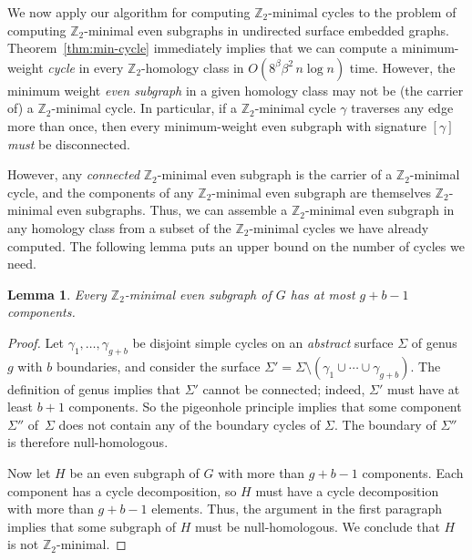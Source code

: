 \documentclass[11pt,twoside]{article}
\def\Z{\mathbb{Z}}
\newtheorem{lemma}[theorem]{Lemma}
\begin{document}
{We now apply our algorithm for computing $\Z_2$-minimal cycles to the problem of computing $\Z_2$-minimal even subgraphs in undirected surface embedded graphs.
Theorem~\ref{thm:min-cycle} immediately implies that we can compute a minimum-weight \emph{cycle} in every $\Z_2$-homology class in $O(8^\beta \beta^2\, n\log n)$ time.  However, the minimum weight \emph{even subgraph} in a given homology class may not be (the carrier of) a $\Z_2$-minimal cycle.  In particular, if a $\Z_2$-minimal cycle $\gamma$ traverses any edge more than once, then every minimum-weight even subgraph with signature $[\gamma]$ \emph{must} be disconnected.

However, any \emph{connected} $\Z_2$-minimal even subgraph is the carrier of a $\Z_2$-minimal cycle, and the components of any $\Z_2$-minimal even subgraph are themselves $\Z_2$-minimal even subgraphs.  Thus, we can assemble a $\Z_2$-minimal even subgraph in any homology class from a subset of the $\Z_2$-minimal cycles we have already computed.  The following lemma puts an upper bound on the number of cycles we need.

\begin{lemma}
\label{lem:even-comps}
Every $\Z_2$-minimal even subgraph of $G$ has at most $g+b-1$ components.
\end{lemma}

\begin{proof}
Let $\gamma_1, \dots, \gamma_{g+b}$ be disjoint simple cycles on an \emph{abstract} surface $\Sigma$ of genus $g$ with $b$ boundaries, and consider the surface $\Sigma' = \Sigma \setminus (\gamma_1 \cup \cdots \cup \gamma_{g+b})$.  The definition of genus implies that $\Sigma'$ cannot be connected; indeed, $\Sigma'$ must have at least $b+1$ components.  So the pigeonhole principle implies that some component $\Sigma''$ of~$\Sigma$ does not contain any of the boundary cycles of $\Sigma$.  The boundary of $\Sigma''$ is therefore null-homologous.

Now let $H$ be an even subgraph of $G$ with more than $g+b-1$ components.  Each component has a cycle decomposition, so $H$ must have a cycle decomposition with more than $g+b-1$ elements.  Thus, the argument in the first paragraph implies that some subgraph of $H$ must be null-homologous.  We conclude that $H$ is not $\Z_2$-minimal.
\end{proof}

}
\end{document}
